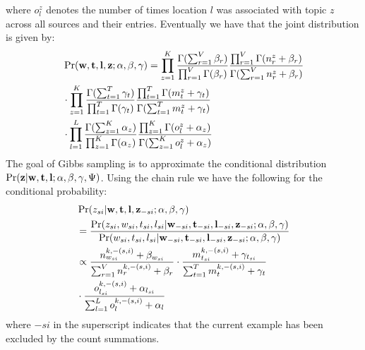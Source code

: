 \documentclass[conference]{IEEEtran}
\newcommand{\w}{{\bf w}}
\newcommand{\z}{{\bf z}}
\newcommand{\loc}{{\bf l}}
\newcommand{\tim}{{\bf t}}
\begin{document}
where $o^z_l$ denotes the number of times location $l$ was associated with topic $z$ across all sources and their entries. 
Eventually we have that the joint distribution is given by:
{\scriptsize
\begin{align}
&\Pr(\w,\tim,\loc,\z;\alpha,\beta,\gamma) = \prod_{z = 1}^K \frac{\Gamma(\sum_{r = 1}^V \beta_r)}{\prod_{r = 1}^V \Gamma(\beta_r)} \frac{\prod_{r = 1}^V \Gamma(n^{z}_{r} + \beta_r)}{\Gamma(\sum_{r =1}^V n^{z}_{r} + \beta_r)} \nonumber \\
&\cdot \prod_{z = 1}^K \frac{\Gamma(\sum_{t = 1}^T \gamma_t)}{\prod_{t = 1}^T \Gamma(\gamma_t)} \frac{\prod_{t = 1}^T \Gamma(m^{z}_{t} + \gamma_t)}{\Gamma(\sum_{t =1}^T m^{z}_{t} + \gamma_t)} \nonumber \\
& \cdot \prod_{l =1}^L\frac{\Gamma(\sum_{z = 1}^K \alpha_z)}{\prod_{z = 1}^K \Gamma(\alpha_z)}\frac{\prod_{z=1}^K\Gamma(o^z_l + \alpha_z)}{\Gamma(\sum_{z = 1}^K o^z_l + \alpha_z)}  \nonumber
\end{align}}
The goal of Gibbs sampling is to approximate the conditional distribution $\Pr(\z | \w, \tim,\loc;\alpha,\beta,\gamma,\Psi)$. Using the chain rule we have the following for the conditional probability:
{\scriptsize
\begin{align}
&\Pr(z_{si}| \w,\tim,\loc,\z_{-si};\alpha,\beta,\gamma) \nonumber \\
&= \frac{\Pr(z_{si}, w_{si}, t_{si}, l_{si}|\w_{-si},\tim_{-si},\loc_{-si},\z_{-si};\alpha,\beta,\gamma)}{\Pr(w_{si}, t_{si}, l_{si}|\w_{-si},\tim_{-si},\loc_{-si},\z_{-si};\alpha,\beta,\gamma)} \nonumber \\
& \propto \frac{n^{k,-(s,i)}_{w_{si}} + \beta_{w_{si}}}{\sum_{r = 1}^V n^{k,-(s,i)}_{r} + \beta_{r}} \cdot \frac{m^{k,-(s,i)}_{t_{si}} + \gamma_{t_{si}}}{\sum_{t = 1}^T m^{k,-(s,i)}_{t} + \gamma_{t}} \nonumber \\
& \cdot \frac{o^{k,-(s,i)}_{l_{si}} + \alpha_{l_{si}}}{\sum_{l = 1}^L o^{k,-(s,i)}_{l} + \alpha_{l}} \nonumber
\end{align}}
where $-si$ in the superscript indicates that the current example has been excluded by the count summations. 
\end{document}
